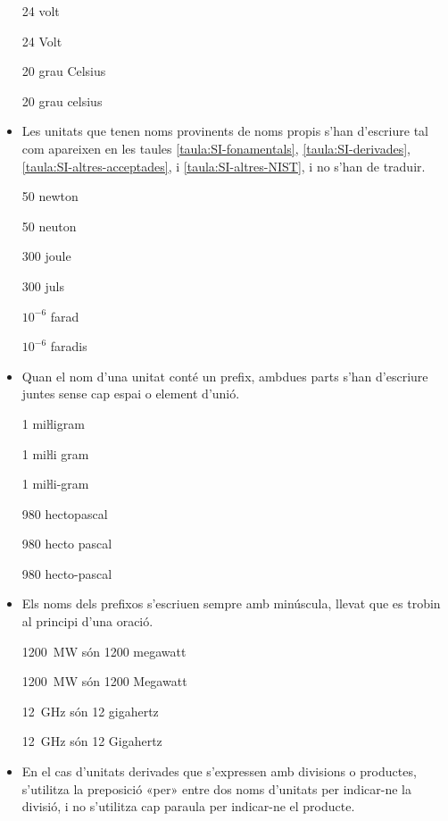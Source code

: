 \begin{itemize}
\textcolor{Green}\faCheckSquare{}  24 volt

\textcolor{Red}\faTimesCircle{} 24 Volt

\textcolor{Green}\faCheckSquare{}  20 grau Celsius

\textcolor{Red}\faTimesCircle{} 20 grau celsius


\item Les unitats que tenen noms provinents de noms propis s'han
d'escriure tal com apareixen en les taules
\vref{taula:SI-fonamentals}, \vref{taula:SI-derivades}, \vref{taula:SI-altres-acceptades}, i \vref{taula:SI-altres-NIST}, i no s'han de traduir.

\textcolor{Green}\faCheckSquare{} 50 newton

\textcolor{Red}\faTimesCircle{}  50 neuton

\textcolor{Green}\faCheckSquare{} 300 joule

\textcolor{Red}\faTimesCircle{}  300 juls

\textcolor{Green}\faCheckSquare{} $10^{-6}$ farad

\textcolor{Red}\faTimesCircle{}  $10^{-6}$ faradis


 \item Quan el nom d'una unitat
conté un prefix, ambdues parts s'han d'escriure juntes sense cap espai o element d'unió.

\textcolor{Green}\faCheckSquare{} 1 miŀligram

\textcolor{Red}\faTimesCircle{} 1 miŀli gram

\textcolor{Red}\faTimesCircle{} 1 miŀli-gram

\textcolor{Green}\faCheckSquare{}  980 hectopascal

\textcolor{Red}\faTimesCircle{} 980 hecto pascal

\textcolor{Red}\faTimesCircle{} 980 hecto-pascal


\item Els noms dels prefixos s'escriuen sempre amb minúscula, llevat que es trobin al principi d'una oració.

\textcolor{Green}\faCheckSquare{} \qty{1200}{MW} són 1200 megawatt

\textcolor{Red}\faTimesCircle{} \qty{1200}{MW} són 1200 Megawatt

\textcolor{Green}\faCheckSquare{} \qty{12}{GHz} són 12 gigahertz

\textcolor{Red}\faTimesCircle{} \qty{12}{GHz}  són 12 Gigahertz


\item En el cas  d'unitats derivades que s'expressen amb divisions o
productes, s'utilitza la preposició «per» entre dos noms d'unitats
per indicar-ne la divisió, i no s'utilitza cap paraula per indicar-ne el
producte.


\end{itemize}
